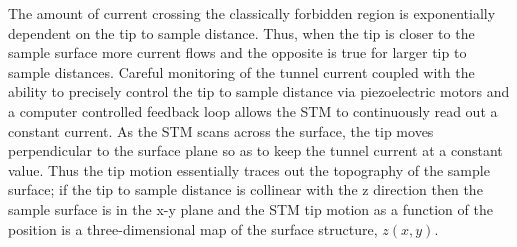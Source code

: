 The amount of current crossing the classically forbidden region is exponentially dependent on the tip to sample distance. Thus, when the tip is closer to the sample surface more current flows and the opposite is true for larger tip to sample distances. Careful monitoring of the tunnel current coupled with the ability to precisely control the tip to sample distance via piezoelectric motors and a computer controlled feedback loop allows the STM to continuously read out a constant current. As the STM scans across the surface, the tip moves perpendicular to the surface plane so as to keep the tunnel current at a constant value. Thus the tip motion essentially traces out the topography of the sample surface; if the tip to sample distance is collinear with the z direction then the sample surface is in the x-y plane and the STM tip motion as a function of the position is a three-dimensional map of the surface structure, $z(x,y)$.

